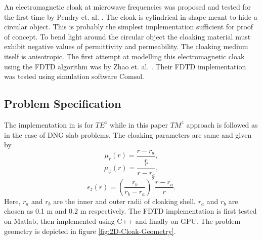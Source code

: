 \documentclass{article}
\begin{document}
An electromagnetic cloak at microwave frequencies was proposed and tested for the first time by Pendry et. al. \cite{PendryShurig-MicrowaveCloak}. The cloak is cylindrical in shape meant to hide a circular object. This is probably the simplest implementation sufficient for proof of concept. To bend light around the circular object the cloaking material must exhibit negative values of permittivity and permeability. The cloaking medium itself is anisotropic. The first attempt at modelling this electromagnetic cloak using the FDTD algorithm was by Zhao et. al. \cite{Radial-Zhao}. Their FDTD implementation was tested using simulation software Comsol.
\subsection{Problem Specification}
The implementation in \cite{Radial-Zhao} is for $TE^z$ while in this paper $TM^z$ approach is followed as in the case of DNG slab problems. The cloaking parameters are same and given by
\begin{equation}
\mu_r(r)=\dfrac{r-r_a}{r},
\label{mu-r}
\end{equation}
\begin{equation}
\mu_{\phi}(r)=\dfrac{r}{r-r_a},
\label{mu-phi}
\end{equation}
\begin{equation}
\epsilon_z(r)=\left(\dfrac{r_b}{r_b-r_a}\right)^2\dfrac{r-r_a}{r}.
\label{epsilon-z}
\end{equation}
Here, $r_a$ and $r_b$ are the inner and outer radii of cloaking shell. $r_a$ and $r_b$ are chosen as 0.1 m and 0.2 m respectively. The FDTD implementation is first tested on Matlab, then implemented using C++ and finally on GPU. The problem geometry is depicted in figure \ref{fig:2D-Cloak-Geometry}.
\end{document}

